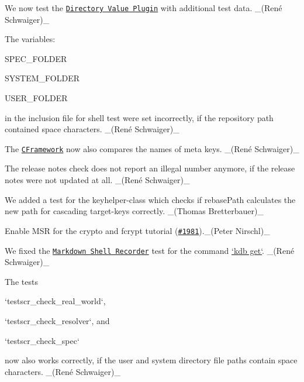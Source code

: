 \begin{DoxyItemize}
\item We now test the \href{https://www.libelektra.org/plugins/directoryvalue}{\tt Directory Value Plugin} with additional test data. \+\_\+(René Schwaiger)\+\_\+
\item The variables\+:
\begin{DoxyItemize}
\item {\ttfamily S\+P\+E\+C\+\_\+\+F\+O\+L\+D\+ER}
\item {\ttfamily S\+Y\+S\+T\+E\+M\+\_\+\+F\+O\+L\+D\+ER}
\item {\ttfamily U\+S\+E\+R\+\_\+\+F\+O\+L\+D\+ER}
\end{DoxyItemize}

in the inclusion file for shell test were set incorrectly, if the repository path contained space characters. \+\_\+(René Schwaiger)\+\_\+
\item The \href{https://master.libelektra.org/tests/cframework}{\tt C\+Framework} now also compares the names of meta keys. \+\_\+(René Schwaiger)\+\_\+
\item The release notes check does not report an illegal number anymore, if the release notes were not updated at all. \+\_\+(René Schwaiger)\+\_\+
\item We added a test for the keyhelper-\/class which checks if rebase\+Path calculates the new path for cascading target-\/keys correctly. \+\_\+(\+Thomas Bretterbauer)\+\_\+
\item Enable M\+SR for the crypto and fcrypt tutorial (\href{https://github.com/ElektraInitiative/libelektra/issues/1981}{\tt \#1981}).\+\_\+(\+Peter Nirschl)\+\_\+
\item We fixed the \href{https://master.libelektra.org/tests/shell/shell_recorder/tutorial_wrapper}{\tt Markdown Shell Recorder} test for the command \hyperlink{doc_help_kdb-get_md}{`kdb get`}. \+\_\+(René Schwaiger)\+\_\+
\item The tests
\begin{DoxyItemize}
\item `testscr\+\_\+check\+\_\+real\+\_\+world`,
\item `testscr\+\_\+check\+\_\+resolver`, and
\item `testscr\+\_\+check\+\_\+spec`
\end{DoxyItemize}

now also works correctly, if the {\ttfamily user} and {\ttfamily system} directory file paths contain space characters. \+\_\+(René Schwaiger)\+\_\+
\end{DoxyItemize}


